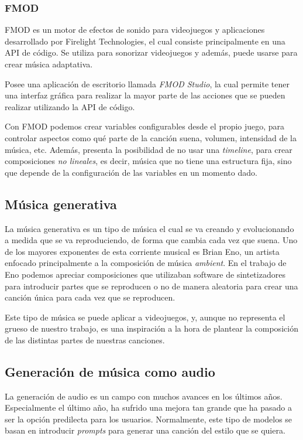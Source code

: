 \subsubsection{FMOD}

FMOD es un motor de efectos de sonido para videojuegos y aplicaciones desarrollado por Firelight Technologies, el cual consiste principalmente en una API de código. Se utiliza para sonorizar videojuegos y además, puede usarse para crear música adaptativa.

Posee una aplicación de escritorio llamada \textit{FMOD Studio}, la cual permite tener una interfaz gráfica para realizar la mayor parte de las acciones que se pueden realizar utilizando la API de código.

Con FMOD podemos crear variables configurables desde el propio juego, para controlar aspectos como qué parte de la canción suena, volumen, intensidad de la música, etc. Además, presenta la posibilidad de no usar una \textit{timeline}, para crear composiciones \textit{no lineales}, es decir, música que no tiene una estructura fija, sino que depende de la configuración de las variables en un momento dado.

\subsection{Música generativa}
La música generativa es un tipo de música el cual se va creando y evolucionando a medida que se va reproduciendo, de forma que cambia cada vez que suena. Uno de los mayores exponentes de esta corriente musical es Brian Eno, un artista enfocado principalmente a la composición de música \textit{ambient}. En el trabajo de Eno podemos apreciar composiciones que utilizaban software de sintetizadores para introducir partes que se reproducen o no de manera aleatoria para crear una canción única para cada vez que se reproducen.

Este tipo de música se puede aplicar a videojuegos, y, aunque no representa el grueso de nuestro trabajo, es una inspiración a la hora de plantear la composición de las distintas partes de nuestras canciones.

\subsection{Generación de música como audio}
La generación de audio es un campo con muchos avances en los últimos años. Especialmente el último año, ha sufrido una mejora tan grande que ha pasado a ser la opción predilecta para los usuarios. Normalmente, este tipo de modelos se basan en introducir \textit{prompts} para generar una canción del estilo que se quiera.


